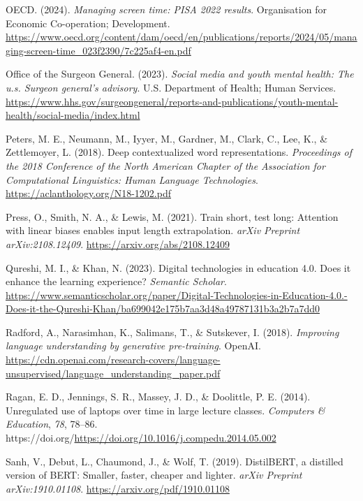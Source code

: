 \documentclass[
  titlepage]{article}
\newlength{\cslhangindent}
\newenvironment{CSLReferences}[2] %
 {\begin{list}{}{%
  \setlength{\itemindent}{0pt}
  \setlength{\leftmargin}{0pt}
  \setlength{\parsep}{0pt}
  \ifodd #1
   \setlength{\leftmargin}{\cslhangindent}
   \setlength{\itemindent}{-1\cslhangindent}
  \fi
  \setlength{\itemsep}{#2\baselineskip}}}
 {\end{list}}
\begin{document}
\begin{CSLReferences}{1}{0}
OECD. (2024). \emph{Managing screen time: PISA 2022 results}.
Organisation for Economic Co-operation; Development.
\url{https://www.oecd.org/content/dam/oecd/en/publications/reports/2024/05/managing-screen-time_023f2390/7c225af4-en.pdf}

Office of the Surgeon General. (2023). \emph{Social media and youth
mental health: The u.s. Surgeon general's advisory}. U.S. Department of
Health; Human Services.
\url{https://www.hhs.gov/surgeongeneral/reports-and-publications/youth-mental-health/social-media/index.html}

Peters, M. E., Neumann, M., Iyyer, M., Gardner, M., Clark, C., Lee, K.,
\& Zettlemoyer, L. (2018). Deep contextualized word representations.
\emph{Proceedings of the 2018 Conference of the North American Chapter
of the Association for Computational Linguistics: Human Language
Technologies}. \url{https://aclanthology.org/N18-1202.pdf}

Press, O., Smith, N. A., \& Lewis, M. (2021). Train short, test long:
Attention with linear biases enables input length extrapolation.
\emph{arXiv Preprint arXiv:2108.12409}.
\url{https://arxiv.org/abs/2108.12409}

Qureshi, M. I., \& Khan, N. (2023). Digital technologies in education
4.0. Does it enhance the learning experience? \emph{Semantic Scholar}.
\url{https://www.semanticscholar.org/paper/Digital-Technologies-in-Education-4.0.-Does-it-the-Qureshi-Khan/ba699042e175b7aa3d48a49787131b3a2b7a7dd0}

Radford, A., Narasimhan, K., Salimans, T., \& Sutskever, I. (2018).
\emph{Improving language understanding by generative pre-training}.
OpenAI.
\url{https://cdn.openai.com/research-covers/language-unsupervised/language_understanding_paper.pdf}

Ragan, E. D., Jennings, S. R., Massey, J. D., \& Doolittle, P. E.
(2014). Unregulated use of laptops over time in large lecture classes.
\emph{Computers \& Education}, \emph{78}, 78--86.
https://doi.org/\url{https://doi.org/10.1016/j.compedu.2014.05.002}

Sanh, V., Debut, L., Chaumond, J., \& Wolf, T. (2019). DistilBERT, a
distilled version of BERT: Smaller, faster, cheaper and lighter.
\emph{arXiv Preprint arXiv:1910.01108}.
\url{https://arxiv.org/pdf/1910.01108}


\end{CSLReferences}
\end{document}
